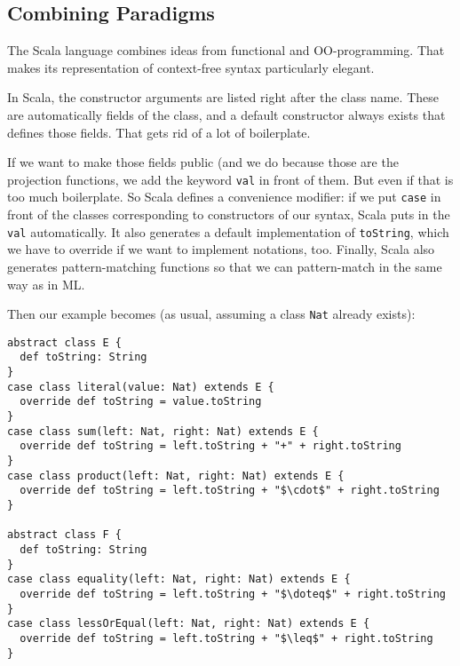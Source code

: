 \subsection{Combining Paradigms}

The Scala language combines ideas from functional and OO-programming.
That makes its representation of context-free syntax particularly elegant.

In Scala, the constructor arguments are listed right after the class name.
These are automatically fields of the class, and a default constructor always exists that defines those fields.
That gets rid of a lot of boilerplate.

If we want to make those fields public (and we do because those are the projection functions, we add the keyword \texttt{val} in front of them.
But even if that is too much boilerplate. So Scala defines a convenience modifier: if we put \texttt{case} in front of the classes corresponding to constructors of our syntax, Scala puts in the \texttt{val} automatically.
It also generates a default implementation of \texttt{toString}, which we have to override if we want to implement notations, too.
Finally, Scala also generates pattern-matching functions so that we can pattern-match in the same way as in ML.

Then our example becomes (as usual, assuming a class \texttt{Nat} already exists):

\begin{lstlisting}
abstract class E {
  def toString: String
}
case class literal(value: Nat) extends E {
  override def toString = value.toString
}
case class sum(left: Nat, right: Nat) extends E {
  override def toString = left.toString + "+" + right.toString
}
case class product(left: Nat, right: Nat) extends E {
  override def toString = left.toString + "$\cdot$" + right.toString
}

abstract class F {
  def toString: String
}
case class equality(left: Nat, right: Nat) extends E {
  override def toString = left.toString + "$\doteq$" + right.toString
}
case class lessOrEqual(left: Nat, right: Nat) extends E {
  override def toString = left.toString + "$\leq$" + right.toString
}
\end{lstlisting}





